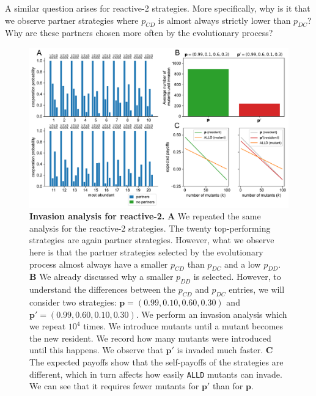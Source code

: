 \documentclass[11pt]{article}
\theoremstyle{plainCl1}
\theoremstyle{plainCl2}
\def\alld{\texttt{ALLD}}
\begin{document}
\noindent
A similar question arises for reactive-2 strategies. More specifically, why is
it that we observe partner strategies where \(p_{CD}\) is almost always strictly
lower than \(p_{DC}\)? Why are these partners chosen more often by the
evolutionary process? \\


\begin{figure}[tbhp]
  \centering
  \includegraphics[width=\textwidth]{../../figures/siFigInvasionR2.pdf}
  \caption{\textbf{Invasion analysis for reactive-2.} 
  {\bf A} We repeated the same analysis for the reactive-2 strategies. The twenty
  top-performing strategies are again partner strategies. However, what we observe
  here is that the partner strategies selected by the evolutionary process almost
  always have a smaller \(p_{CD}\) than \(p_{DC}\) and a low \(p_{DD}\).
  {\bf B } We already discussed why a smaller \(p_{DD}\) is selected. However, to
  understand the differences between the \(p_{CD}\) and \(p_{DC}\) entries, we will consider
  two strategies: \(\mathbf{p} = (0.99, 0.10, 0.60, 0.30)\) and
  \(\mathbf{p'} = (0.99, 0.60, 0.10, 0.30)\). We perform an invasion analysis which
  we repeat \(10^4\) times. We introduce mutants until a mutant becomes the new
  resident. We record how many mutants were introduced until this happens. We
  observe that 
  \(\mathbf{p'}\) is invaded much faster.
  {\bf C} The expected payoffs show that the self-payoffs of the strategies are
  different, which in turn affects how easily \alld{} mutants can invade. We
  can see that it requires fewer mutants for \(\mathbf{p'}\) than for
  \(\mathbf{p}\).}\label{fig:InvasionAnalysisReactive2}
\end{figure}
\end{document}
